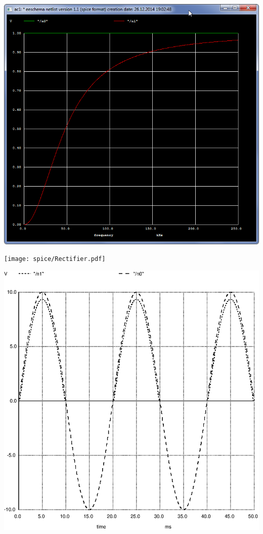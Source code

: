 \pagebreak\noindent
\includegraphics[height=\textheight]{spice/spice5.png}


\noindent
\texttt{[image: spice/Rectifier.pdf]}


\pagebreak\noindent
\includegraphics[height=\textheight]{spice/rectifierplot.eps}

